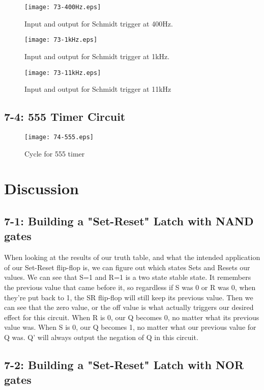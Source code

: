 \documentclass[%
 aip,
 jmp,
 amsmath,
 amssymb,
 reprint,%
 numerical,
 longbibliography,
]{revtex4-1}
\begin{document}
	\begin{figure}[H]
	\texttt{[image: 73-400Hz.eps]}
	\caption{Input and output for Schmidt trigger at 400Hz.}
	\end{figure}
	
	\begin{figure}[H]
	\texttt{[image: 73-1kHz.eps]}
	\caption{Input and output for Schmidt trigger at 1kHz.}
	\end{figure}
	
	\begin{figure}[H]
	\texttt{[image: 73-11kHz.eps]}
	\caption{Input and output for Schmidt trigger at 11kHz}
	\end{figure}
	
	\subsection{7-4: 555 Timer Circuit}	
	
	\begin{figure}[H]
	\texttt{[image: 74-555.eps]}
	\caption{Cycle for 555 timer}
	\end{figure}
	
\section{Discussion}
	
	\subsection{7-1: Building a "Set-Reset" Latch with NAND gates}
	
	When looking at the results of our truth table, and what the intended application of
	our Set-Reset flip-flop is, we can figure out which states Sets and Resets our values.
	We can see that S=1 and R=1 is a two state stable state. It remembers the previous value
	that came before it, so regardless if S was 0 or R was 0, when they're put back to 1, 
	the SR flip-flop will still keep its previous value. Then we can see that the zero value,
	or the off value is what actually triggers our desired effect for this circuit. When
	R is 0, our Q becomes 0, no matter what its previous value was. When S is 0, our Q becomes
	1, no matter what our previous value for Q was. Q' will always output the negation of Q 
	in this circuit.

	\subsection{7-2: Building a "Set-Reset" Latch with NOR gates}
	
\end{document}
